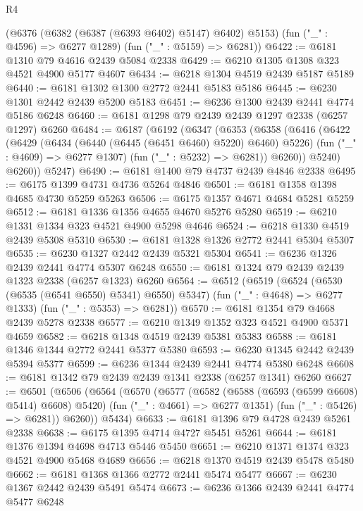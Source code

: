 \begin{lexlean}{R4}
\begin{coremodule}
      (@6376 (@6382 (@6387 (@6393 @6402) @5147) @6402) @5153)
      (fun ("_" : @4596) => @6277 @1289)
      (fun ("_" : @5159) => @6281))
@6422 := @6181 @1310 @79 @4616 @2439 @5084 @2338
@6429 := @6210 @1305 @1308 @323 @4521 @4900 @5177 @4607
@6434 := @6218 @1304 @4519 @2439 @5187 @5189
@6440 := @6181 @1302 @1300 @2772 @2441 @5183 @5186
@6445 := @6230 @1301 @2442 @2439 @5200 @5183
@6451 := @6236 @1300 @2439 @2441 @4774 @5186 @6248
@6460 := @6181 @1298 @79 @2439 @2439 @1297 @2338 (@6257 @1297) @6260
@6484 := @6187
    (@6192
      (@6347
        (@6353
          (@6358
            (@6416
              (@6422
                (@6429
                  (@6434 (@6440 (@6445 (@6451 @6460) @5220) @6460) @5226)
                  (fun ("_" : @4609) => @6277 @1307)
                  (fun ("_" : @5232) => @6281))
                @6260))
            @5240)
          @6260))
      @5247)
@6490 := @6181 @1400 @79 @4737 @2439 @4846 @2338
@6495 := @6175 @1399 @4731 @4736 @5264 @4846
@6501 := @6181 @1358 @1398 @4685 @4730 @5259 @5263
@6506 := @6175 @1357 @4671 @4684 @5281 @5259
@6512 := @6181 @1336 @1356 @4655 @4670 @5276 @5280
@6519 := @6210 @1331 @1334 @323 @4521 @4900 @5298 @4646
@6524 := @6218 @1330 @4519 @2439 @5308 @5310
@6530 := @6181 @1328 @1326 @2772 @2441 @5304 @5307
@6535 := @6230 @1327 @2442 @2439 @5321 @5304
@6541 := @6236 @1326 @2439 @2441 @4774 @5307 @6248
@6550 := @6181 @1324 @79 @2439 @2439 @1323 @2338 (@6257 @1323) @6260
@6564 := @6512
    (@6519
      (@6524 (@6530 (@6535 (@6541 @6550) @5341) @6550) @5347)
      (fun ("_" : @4648) => @6277 @1333)
      (fun ("_" : @5353) => @6281))
@6570 := @6181 @1354 @79 @4668 @2439 @5278 @2338
@6577 := @6210 @1349 @1352 @323 @4521 @4900 @5371 @4659
@6582 := @6218 @1348 @4519 @2439 @5381 @5383
@6588 := @6181 @1346 @1344 @2772 @2441 @5377 @5380
@6593 := @6230 @1345 @2442 @2439 @5394 @5377
@6599 := @6236 @1344 @2439 @2441 @4774 @5380 @6248
@6608 := @6181 @1342 @79 @2439 @2439 @1341 @2338 (@6257 @1341) @6260
@6627 := @6501
    (@6506
      (@6564
        (@6570
          (@6577
            (@6582 (@6588 (@6593 (@6599 @6608) @5414) @6608) @5420)
            (fun ("_" : @4661) => @6277 @1351)
            (fun ("_" : @5426) => @6281))
          @6260))
      @5434)
@6633 := @6181 @1396 @79 @4728 @2439 @5261 @2338
@6638 := @6175 @1395 @4714 @4727 @5451 @5261
@6644 := @6181 @1376 @1394 @4698 @4713 @5446 @5450
@6651 := @6210 @1371 @1374 @323 @4521 @4900 @5468 @4689
@6656 := @6218 @1370 @4519 @2439 @5478 @5480
@6662 := @6181 @1368 @1366 @2772 @2441 @5474 @5477
@6667 := @6230 @1367 @2442 @2439 @5491 @5474
@6673 := @6236 @1366 @2439 @2441 @4774 @5477 @6248

\end{coremodule}
\end{lexlean}
